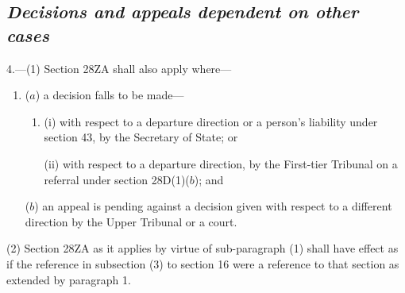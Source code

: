 \documentclass[12pt,a4paper]{article}
\begin{document}

\subsection*{\itshape Decisions and appeals dependent on other cases}

4.---(1) Section 28ZA shall also apply where—
\begin{enumerate}\item[]
($a$) a decision falls to be made—
\begin{enumerate}\item[]
(i) with respect to a departure direction
or a person’s liability under section 43, by the Secretary of State; or

(ii) with respect to a departure direction, by 
the First-tier Tribunal  %
on a referral under section 28D(1)($b$); and
\end{enumerate}

($b$) an appeal is pending against a decision given with respect to a different direction by 
the Upper Tribunal  %
or a court.
\end{enumerate}

(2) Section 28ZA as it applies by virtue of sub-paragraph (1) shall have effect as if the reference in subsection (3) to section 16 were a reference to that section as extended by paragraph 1.
\end{document}
